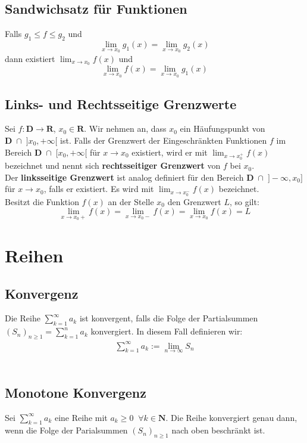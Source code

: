 \documentclass[8pt]{article}
\begin{document}
\begin{multicols*}{3}
  \subsection{Sandwichsatz für Funktionen}
Falls $g_1 \leq f \leq g_2$ und
  $$
  \lim_{x \rightarrow x_0} g_1(x) = \lim_{x \rightarrow x_0} g_2(x)
  $$
  dann existiert $\lim_{x \rightarrow x_0} f(x)$ und
  $$
  \lim_{x \rightarrow x_0} f(x) = \lim_{x \rightarrow x_0} g_1(x)
  $$
 \subsection{Links- und Rechtsseitige Grenzwerte}
Sei $f: \mathbf{D} \rightarrow \mathbf{R}$, $x_0 \in \mathbf{R}$. Wir nehmen an, dass
$x_0$ ein Häufungspunkt von $\mathbf{D} \;\cap\; ]x_0, +\infty[$ ist. Falls der Grenzwert
der Eingeschränkten Funktionen $f$ im Bereich $\mathbf{D} \;\cap\; [x_0, +\infty[$ für
$x \rightarrow x_0$ existiert, wird er mit $\lim_{x \rightarrow x_0^+} f(x)$ bezeichnet und
nennt sich \textbf{rechtsseitiger Grenzwert} von $f$ bei $x_0$.\\
Der \textbf{linksseitige Grenzwert} ist analog definiert für den Bereich $\mathbf{D} \;\cap\; ]-\infty, x_0]$
für $x \rightarrow x_0$, falls er existiert. Es wird mit $\lim_{x \rightarrow x_0^-} f(x)$ bezeichnet.\\
Besitzt die Funktion $f(x)$ an der Stelle $x_0$ den Grenzwert $L$, so gilt:
$$
  \lim_{x \rightarrow x_0+} f(x) = \lim_{x \rightarrow x_0-} f(x) = \lim_{x \rightarrow x_0} f(x) = L
$$
\section{Reihen}
\hypertarget{sec:1}{}
  \subsection{Konvergenz}
Die Reihe $\sum_{k = 1}^{\infty} a_k$ ist konvergent, falls die Folge der
Partialsummen $(S_n)_{n \geq 1} = \sum_{k = 1}^{n} a_k$
konvergiert. In diesem Fall definieren wir:
\begin{align*}
  \sum_{k = 1}^{\infty} a_k := \lim_{n \rightarrow \infty} S_n
\end{align*}\\
  \subsection {Monotone Konvergenz}
Sei $\sum_{k = 1}^\infty a_k$ eine Reihe mit $a_k \geq 0 \;\; \forall k \in \mathbf{N}$.
Die Reihe konvergiert genau dann, wenn die Folge der Parialsummen $(S_n)_{n \geq 1}$ nach
oben beschränkt ist.

\end{multicols*}
\end{document}
